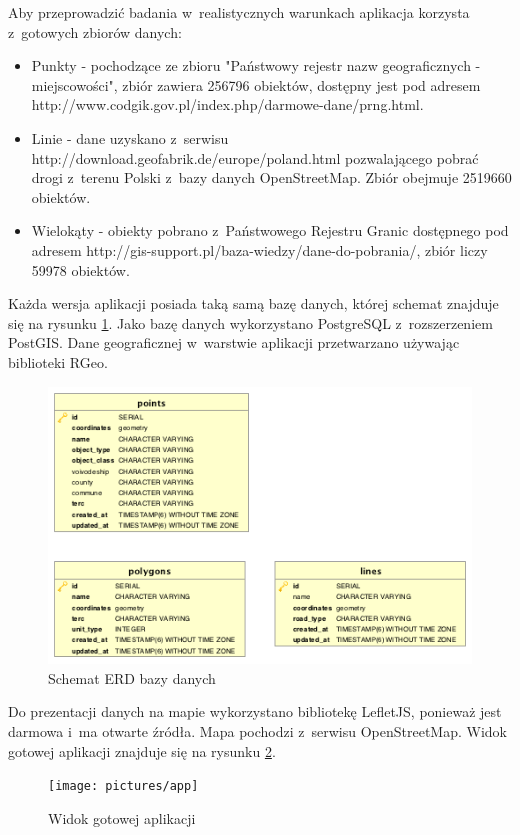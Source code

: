 \documentclass[archivemode]{mgr}
\begin{document}
Aby przeprowadzić badania w~realistycznych warunkach aplikacja korzysta z~gotowych zbiorów danych:
\begin{itemize}
  \item Punkty - pochodzące ze zbioru "Państwowy rejestr nazw geograficznych - miejscowości", zbiór zawiera 256796 obiektów, dostępny jest pod adresem http://www.codgik.gov.pl/index.php/darmowe-dane/prng.html.
  \item Linie - dane uzyskano z~serwisu http://download.geofabrik.de/europe/poland.html pozwalającego pobrać drogi z~terenu Polski z~bazy danych OpenStreetMap. Zbiór obejmuje 2519660 obiektów.
  \item Wielokąty - obiekty pobrano z~Państwowego Rejestru Granic dostępnego pod adresem http://gis-support.pl/baza-wiedzy/dane-do-pobrania/, zbiór liczy 59978 obiektów.
\end{itemize}

Każda wersja aplikacji posiada taką samą bazę danych, której schemat znajduje się na rysunku \ref{fig:erd}. Jako bazę danych wykorzystano PostgreSQL z~rozszerzeniem PostGIS. Dane geograficznej w~warstwie aplikacji przetwarzano używając biblioteki RGeo.

\begin{figure}[H]
  \centering
  \includegraphics[width=0.5\linewidth]{pictures/erd}
  \caption{Schemat ERD bazy danych}
  \label{fig:erd}
\end{figure}

Do prezentacji danych na mapie wykorzystano bibliotekę LefletJS, ponieważ jest darmowa i~ma otwarte źródła. Mapa pochodzi z~serwisu OpenStreetMap. Widok gotowej aplikacji znajduje się na rysunku \ref{fig:app}.

\begin{figure}[H]
  \centering
  \texttt{[image: pictures/app]}
  \caption{Widok gotowej aplikacji}
  \label{fig:app}
\end{figure}
\end{document}
